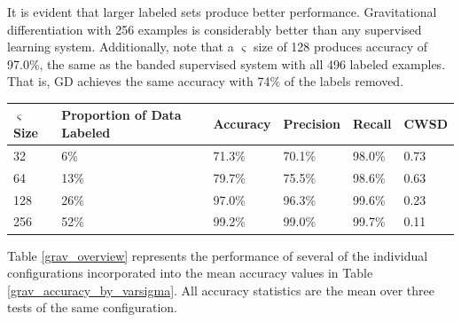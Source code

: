 \documentclass[10pt]{article}
\begin{document}
It is evident that larger labeled sets produce better performance. Gravitational differentiation with 256 examples is considerably better than any supervised learning system. Additionally, note that a $\varsigma$ size of 128 produces accuracy of 97.0\%, the same as the banded supervised system with all 496 labeled examples. That is, GD achieves the same accuracy with 74\% of the labels removed.

\begin{minipage}{\textwidth}
    \begin{center}
         \label{grav_accuracy_by_varsigma}
        \begin{tabular}{|l|l|l|l|l|l|}
            \hline
            $\varsigma$ Size & Proportion of Data Labeled & Accuracy & Precision & Recall & CWSD \\
            \hline
            32 & 6\% & 71.3\% & 70.1\% & 98.0\% & 0.73 \\
            \hline
            64 & 13\% & 79.7\% & 75.5\% & 98.6\% & 0.63 \\
            \hline
            128 & 26\% & 97.0\% & 96.3\% & 99.6\% & 0.23 \\
            \hline
            256 & 52\% & 99.2\% & 99.0\% & 99.7\% & 0.11 \\
            \hline
        \end{tabular}
    \end{center}
\end{minipage}

Table \ref{grav_overview} represents the performance of several of the individual configurations incorporated into the mean accuracy values in Table \ref{grav_accuracy_by_varsigma}. All accuracy statistics are the mean over three tests of the same configuration.
\end{document}
